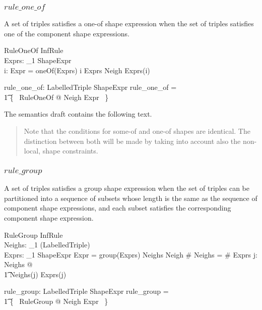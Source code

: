 \documentclass{article}
\begin{document}
\subsubsection{$rule\_one\_of$}
A set of triples satisfies a one-of shape expression when the set of triples satisfies one of the component
shape expressions.
\begin{schema}{RuleOneOf}
	InfRule \\
	Exprs: \seq_1 ShapeExpr \\
	i: \nat
\where
	Expr = oneOf(Exprs)
\also
	i \in \dom Exprs
\also
	Neigh  Exprs(i)
\end{schema}

\begin{axdef}
	rule\_one\_of: \finset LabelledTriple \rel ShapeExpr
\where
	rule\_one\_of = \\
\t1		\{~ RuleOneOf @ Neigh \mapsto Expr ~\}
\end{axdef}

The semantics draft contains the following text.
\begin{quote}
Note that the conditions for some-of and one-of shapes are identical. 
The distinction between both will be made by taking into account also the non-local, shape constraints.
\end{quote}

\subsubsection{$rule\_group$}
A set of triples satisfies a group shape expression when the set of triples can be partitioned into a sequence of subsets whose length
is the same as the sequence of component shape expressions, and each subset satisfies the corresponding component shape expression.
\begin{schema}{RuleGroup}
	InfRule \\
	Neighs: \seq_1 (\finset LabelledTriple) \\
	Exprs: \seq_1 ShapeExpr
\where
	Expr = group(Exprs)
\also
	Neighs \partition Neigh
\also
	\# Neighs = \# Exprs
\also
	\forall j: \dom Neighs @ \\
\t1		Neighs(j)  Exprs(j)
\end{schema}

\begin{axdef}
	rule\_group: \finset LabelledTriple \rel ShapeExpr
\where
	rule\_group = \\
\t1		\{~ RuleGroup @ Neigh \mapsto Expr ~\}
\end{axdef}
\end{document}
